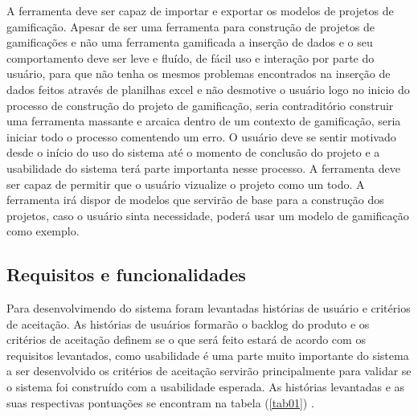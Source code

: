 A ferramenta deve ser capaz de importar e exportar os modelos de projetos de gamificação. Apesar de ser uma ferramenta para construção de projetos de gamificações e não uma ferramenta gamificada a inserção de dados e o seu comportamento deve ser leve e fluído, de fácil uso  e interação por parte do usuário, para que não tenha os mesmos problemas encontrados na inserção de dados feitos através de planilhas excel e não desmotive o usuário logo no inicio do processo de construção do projeto de gamificação, seria contraditório construir uma ferramenta massante e arcaica dentro de um contexto de gamificação, seria iniciar todo o processo comentendo um erro. O usuário deve se sentir motivado desde o início do uso do sistema até o momento de conclusão do projeto e a usabilidade do sistema terá parte importanta nesse processo. A ferramenta deve ser capaz de permitir que o usuário vizualize o projeto como um todo.  A ferramenta irá dispor de modelos que servirão de base para a construção dos projetos, caso o usuário sinta necessidade, poderá usar um modelo de gamificação como exemplo. 



\subsection{Requisitos e funcionalidades}
Para desenvolvimendo do sistema foram levantadas histórias de usuário e critérios de aceitação. As histórias de usuários formarão o backlog do produto e os critérios de aceitação definem se o que será feito estará de acordo com os requisitos levantados, como usabilidade é uma parte muito importante do sistema a ser desenvolvido os critérios de aceitação servirão principalmente para validar se o sistema foi construído com a usabilidade esperada. As histórias levantadas e as suas respectivas pontuações se encontram na tabela (\ref{tab01}) . 



